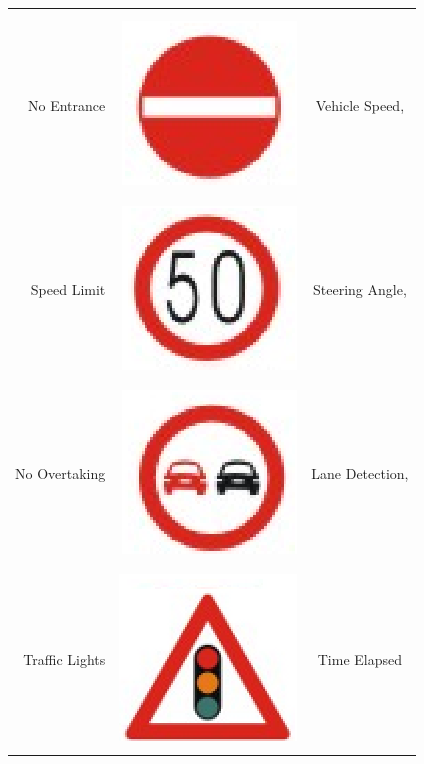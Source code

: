 \documentclass{beamer}
\begin{document}
{\begin{table}[!ht]
{\begin{tabular}{|r|r|c|}
	&&\\
	\cline{1-2}
	&&\\
	{\scriptsize No Entrance} & \includegraphics[scale=0.17]{../img/noenter} & {\scriptsize Vehicle Speed,}\\
	&&\\
	\cline{1-2}
	&&\\
	{\scriptsize Speed Limit} & \includegraphics[scale=0.17]{../img/speedlimit} & {\scriptsize Steering Angle,} \\
	&&\\
	\cline{1-2}
	&&\\
	{\scriptsize No Overtaking} & \includegraphics[scale=0.17]{../img/overtake} & {\scriptsize Lane Detection,}\\
	&&\\
	\cline{1-2}
	&&\\
	{\scriptsize Traffic Lights} & \includegraphics[scale=0.17]{../img/trafficligt} & {\scriptsize Time Elapsed}\\
	&&\\
	\hline
	\end{tabular}  
	}
	\label{viol}
	\end{table}
}
\end{document}
